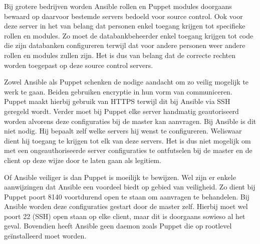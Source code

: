 Bij grotere bedrijven worden Ansible rollen en Puppet modules doorgaans bewaard op daarvoor bestemde servers bedoeld voor source control. Ook voor deze server in het van belang dat personen enkel toegang krijgen tot specifieke rollen en modules. Zo moet de databankbeheerder enkel toegang krijgen tot code die zijn databanken configureren terwijl dat voor andere personen weer andere rollen en modules zullen zijn. Het is dus van belang dat de correcte rechten worden toegepast op deze source control servers.

Zowel Ansible als Puppet schenken de nodige aandacht om zo veilig mogelijk te werk te gaan. Beiden gebruiken encryptie in hun vorm van communiceren. Puppet maakt hierbij gebruik van HTTPS terwijl dit bij Ansible via SSH geregeld wordt. Verder moet bij Puppet elke server handmatig geautoriseerd worden alvorens deze configuraties bij de master kan aanvragen. Bij Ansible is dit niet nodig. Hij bepaalt zelf welke servers hij wenst te configureren. Weliswaar dient hij toegang te krijgen tot elk van deze servers. Het is dus niet mogelijk om met een ongeauthoriseerde server configuraties te ontfutselen bij de master en de client op deze wijze door te laten gaan als legitiem. 

Of Ansible veiliger is dan Puppet is moeilijk te bewijzen. Wel zijn er enkele aanwijzingen dat Ansible een voordeel biedt op gebied van veiligheid. Zo dient bij Puppet poort 8140 voortdurend open te staan om aanvragen te behandelen. Bij Ansible worden deze configuraties gestart door de master zelf. Hierbij moet wel poort 22 (SSH) open staan op elke client, maar dit is doorgaans sowieso al het geval. Bovendien heeft Ansible geen daemon zoals Puppet die op rootlevel geïnstalleerd moet worden.



